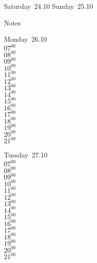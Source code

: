 \documentclass[11pt,a4paper]{book}\usepackage[]{graphicx}\usepackage[]{color}
\begin{document}
\begin{weekendbox}
  Saturday~24.10
  \tcblower
  Sunday~25.10
\end{weekendbox} %
\begin{notebox}
  Notes
\end{notebox}
\clearpage
\begin{headerbox}
\end{headerbox}
\begin{weekdaybox}
  Monday~26.10\\
  { 
  \vfill
  $07^{00}$\\
$08^{00}$\\
$09^{00}$\\
$10^{00}$\\
$11^{00}$\\
$12^{00}$\\
$13^{00}$\\
$14^{00}$\\
$15^{00}$\\
$16^{00}$\\
$17^{00}$\\
$18^{00}$\\
$19^{00}$\\
$20^{00}$\\
$21^{00}$\\
  }
\end{weekdaybox}
\begin{weekdaybox}
  Tuesday~27.10\\
  { 
  \vfill
  $07^{00}$\\
$08^{00}$\\
$09^{00}$\\
$10^{00}$\\
$11^{00}$\\
$12^{00}$\\
$13^{00}$\\
$14^{00}$\\
$15^{00}$\\
$16^{00}$\\
$17^{00}$\\
$18^{00}$\\
$19^{00}$\\
$20^{00}$\\
$21^{00}$\\
  }
\end{weekdaybox}
\end{document}
